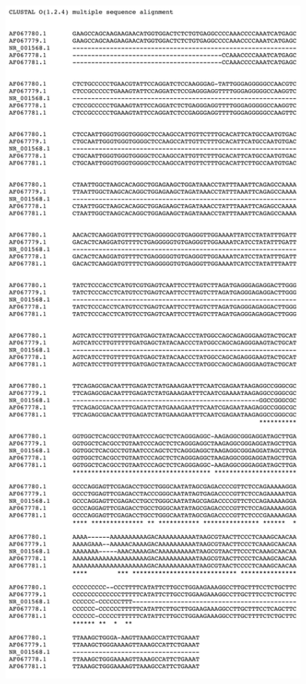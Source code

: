 \documentclass[conference, 11pt]{IEEEtran}
\begin{document}
\begin{figure}[ht]
  \centering
  \includegraphics[height=0.825\textheight, width=\textwidth, keepaspectratio]{figs/alignment.png}
\end{figure}
\end{document}
